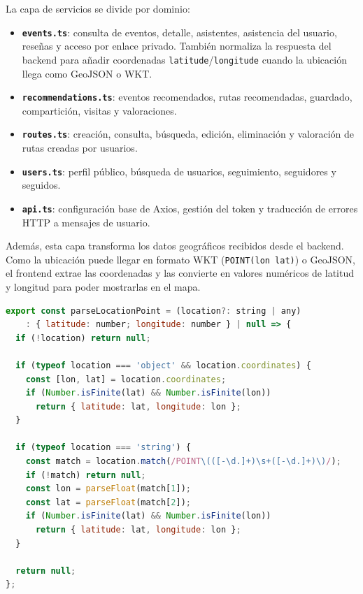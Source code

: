 La capa de servicios se divide por dominio:

\begin{itemize}
    \item \textbf{\texttt{events.ts}}: consulta de eventos, detalle, asistentes, asistencia del usuario, reseñas y acceso por enlace privado. También normaliza la respuesta del backend para añadir coordenadas \texttt{latitude}/\texttt{longitude} cuando la ubicación llega como GeoJSON o WKT.
    \item \textbf{\texttt{recommendations.ts}}: eventos recomendados, rutas recomendadas, guardado, compartición, visitas y valoraciones.
    \item \textbf{\texttt{routes.ts}}: creación, consulta, búsqueda, edición, eliminación y valoración de rutas creadas por usuarios.
    \item \textbf{\texttt{users.ts}}: perfil público, búsqueda de usuarios, seguimiento, seguidores y seguidos.
    \item \textbf{\texttt{api.ts}}: configuración base de Axios, gestión del token y traducción de errores HTTP a mensajes de usuario.
\end{itemize}

Además, esta capa transforma los datos geográficos recibidos desde el backend. Como la ubicación puede llegar en formato WKT (\texttt{POINT(lon lat)}) o GeoJSON, el frontend extrae las coordenadas y las convierte en valores numéricos de latitud y longitud para poder mostrarlas en el mapa.

\begin{lstlisting}[language=JavaScript, caption={Función de parseo de coordenadas geográficas en el frontend}]
export const parseLocationPoint = (location?: string | any)
    : { latitude: number; longitude: number } | null => {
  if (!location) return null;

  if (typeof location === 'object' && location.coordinates) {
    const [lon, lat] = location.coordinates;
    if (Number.isFinite(lat) && Number.isFinite(lon))
      return { latitude: lat, longitude: lon };
  }

  if (typeof location === 'string') {
    const match = location.match(/POINT\(([-\d.]+)\s+([-\d.]+)\)/);
    if (!match) return null;
    const lon = parseFloat(match[1]);
    const lat = parseFloat(match[2]);
    if (Number.isFinite(lat) && Number.isFinite(lon))
      return { latitude: lat, longitude: lon };
  }

  return null;
};
\end{lstlisting}

